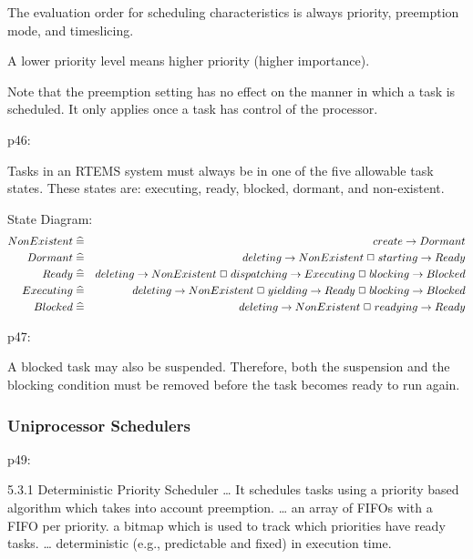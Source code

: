 The evaluation order for scheduling characteristics is always
priority, preemption mode, and timeslicing.

A lower priority level means higher priority (higher importance).

Note that the preemption setting has no effect
on the manner in which a task is scheduled.
It only applies once a task has control of the processor.

p46:

Tasks in an RTEMS system must always be in
one of the five allowable task states.
These states are: executing, ready, blocked, dormant, and non-existent.

State Diagram:
\begin{eqnarray*}
   NonExistent  &\mathrel{\widehat=}&  create      \rightarrow Dormant
\\ Dormant      &\mathrel{\widehat=}&  deleting    \rightarrow NonExistent
                         \mathrel{\Box}
                         starting    \rightarrow Ready
\\ Ready       &\mathrel{\widehat=}&   deleting    \rightarrow NonExistent
                         \mathrel{\Box}
                         dispatching \rightarrow Executing
                         \mathrel{\Box}
                         blocking    \rightarrow Blocked
\\ Executing   &\mathrel{\widehat=}&   deleting    \rightarrow NonExistent
                         \mathrel{\Box}
                         yielding    \rightarrow Ready
                         \mathrel{\Box}
                         blocking    \rightarrow Blocked
\\ Blocked     &\mathrel{\widehat=}&   deleting    \rightarrow NonExistent
                         \mathrel{\Box}
                         readying    \rightarrow Ready
\end{eqnarray*}

p47:

A blocked task may also be suspended.
Therefore,
both the suspension and the blocking condition must be removed
before the task becomes ready to run again.

\subsubsection{Uniprocessor Schedulers}

p49:

5.3.1 Deterministic Priority Scheduler
\dots
It schedules tasks using a priority based algorithm
which takes into account preemption.
\dots
an array of FIFOs with a FIFO per priority.
a bitmap which is used to track which priorities have ready tasks.
\dots
deterministic (e.g., predictable and fixed) in execution time.

